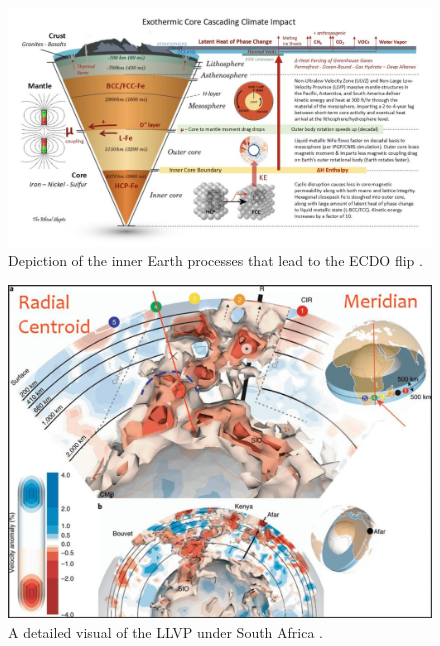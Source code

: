 \documentclass[10pt,twocolumn,letterpaper]{article}
\begin{document}
\begin{figure}[t]
\begin{center}
\includegraphics[width=1\textwidth]{layers.jpg}
\end{center}
   \caption{Depiction of the inner Earth processes that lead to the ECDO flip \cite{129}.}
\label{fig:11}
\end{figure}


\begin{figure}[t]
\begin{center}
   \includegraphics[width=1\linewidth]{llvp.jpg}
\end{center}
   \caption{A detailed visual of the LLVP under South Africa \cite{28}.}
\label{fig:12}
\label{fig:onecol}
\end{figure}
\end{document}
